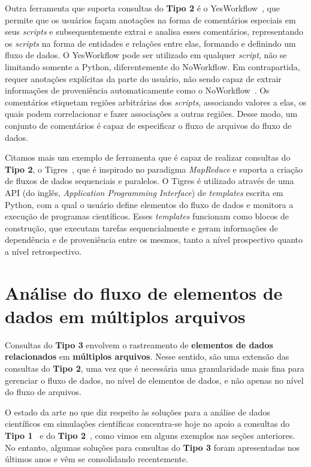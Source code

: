 Outra ferramenta que suporta consultas do \textbf{Tipo 2} é o YesWorkflow~\cite{mcphillips2015yesworkflow}, que permite que os usuários façam anotações na forma de comentários especiais em seus \textit{scripts} e subsequentemente extrai e analisa esses comentários, representando os \textit{scripts} na forma de entidades e relações entre elas, formando e definindo um fluxo de dados. O YesWorkflow pode ser utilizado em qualquer \textit{script}, não se limitando somente a Python, diferentemente do NoWorkflow. Em contrapartida, requer anotações explícitas da parte do usuário, não sendo capaz de extrair informações de proveniência automaticamente como o NoWorkflow~\cite{Pimentel2016}. Os comentários etiquetam regiões arbitrárias dos \textit{scripts}, associando valores a elas, os quais podem correlacionar e fazer associações a outras regiões. Desse modo, um conjunto de comentários é capaz de especificar o fluxo de arquivos do fluxo de dados.

Citamos mais um exemplo de ferramenta que é capaz de realizar consultas do \textbf{Tipo 2}, o Tigres~\cite{hendrix2016tigres}, que é inspirado no paradigma \textit{MapReduce} e suporta a criação de fluxos de dados sequenciais e paralelos. O Tigres é utilizado através de uma  API (do inglês, \textit{Application Programming Interface}) de \textit{templates} escrita em Python, com a qual o usuário define elementos do fluxo de dados e monitora a execução de programas científicos. Esses \textit{templates} funcionam como blocos de construção, que executam tarefas sequencialmente e geram informações de dependência e de proveniência entre os mesmos, tanto a nível prospectivo quanto a nível retrospectivo.

\section{Análise do fluxo de elementos de dados em múltiplos arquivos}%
\label{sec:rastreamento-de-elemento-de-dados-em-multiplos-arquivos}

Consultas do \textbf{Tipo 3} envolvem o rastreamento de \textbf{elementos de dados relacionados} em \textbf{múltiplos arquivos}. Nesse sentido, são uma extensão das consultas do \textbf{Tipo 2}, uma vez que é necessária uma granularidade mais fina para gerenciar o fluxo de dados, no nível de elementos de dados, e não apenas no nível do fluxo de arquivos.

O estado da arte no que diz respeito às soluções para a análise de dados científicos em simulações científicas concentra-se hoje no apoio a consultas do \textbf{Tipo 1}~\cite{alagiannis2012nodb,karpathiotakis2014adaptive,wu2009fastbit,folk1999hdf5,silva2015propostadoutorado} e do \textbf{Tipo 2}~\cite{murta2014noworkflow,mcphillips2015yesworkflow,hendrix2016tigres,Pimentel2016}, como vimos em alguns exemplos nas seções anteriores. No entanto, algumas soluções para consultas do \textbf{Tipo 3} foram apresentadas nos últimos anos e vêm se consolidando recentemente.

